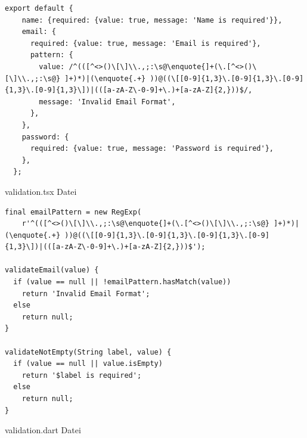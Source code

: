 \documentclass[11pt, twoside]{article}
\begin{document}
\begin{appendix}


\begin{listing}[H]
	\label{lst:quelltext2}

    \begin{verbatim}
export default {
	name: {required: {value: true, message: 'Name is required'}},
	email: {
	  required: {value: true, message: 'Email is required'},
	  pattern: {
		value: /^(([^<>()\[\]\\.,;:\s@\enquote{]+(\.[^<>()\[\]\\.,;:\s@} ]+)*)|(\enquote{.+} ))@((\[[0-9]{1,3}\.[0-9]{1,3}\.[0-9]{1,3}\.[0-9]{1,3}\])|(([a-zA-Z\-0-9]+\.)+[a-zA-Z]{2,}))$/,
		message: 'Invalid Email Format',
	  },
	},
	password: {
	  required: {value: true, message: 'Password is required'},
	},
  };
    \end{verbatim}

    \caption[validation.tsx]{validation.tsx Datei}
\end{listing}


\begin{listing}[H]
	\label{lst:quelltext3}

    \begin{verbatim}
final emailPattern = new RegExp(
	r'^(([^<>()\[\]\\.,;:\s@\enquote{]+(\.[^<>()\[\]\\.,;:\s@} ]+)*)|(\enquote{.+} ))@((\[[0-9]{1,3}\.[0-9]{1,3}\.[0-9]{1,3}\.[0-9]{1,3}\])|(([a-zA-Z\-0-9]+\.)+[a-zA-Z]{2,}))$');

validateEmail(value) {
  if (value == null || !emailPattern.hasMatch(value))
	return 'Invalid Email Format';
  else
	return null;
}

validateNotEmpty(String label, value) {
  if (value == null || value.isEmpty)
	return '$label is required';
  else
	return null;
}		
    \end{verbatim}

    \caption[validation.dart]{validation.dart Datei}
\end{listing}



\end{appendix}
\end{document}
